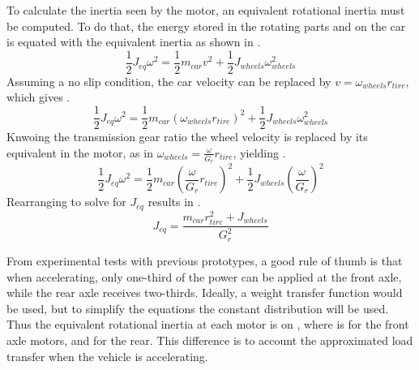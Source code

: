 To calculate the inertia seen by the motor, an equivalent rotational inertia must be computed. To do that, the energy stored in the rotating parts and on the car is equated with the equivalent inertia as shown in .
\begin{equation}
	\frac{1}{2}J_{eq}\omega^2 = \frac{1}{2}m_{car}v^2 + \frac{1}{2}J_{wheels}\omega^2_{wheels}
	\label{eq:iner_equivalent0}
\end{equation}
Assuming a no slip condition, the car velocity can be replaced by $v = \omega_{wheels}r_{tire}$, which gives .
\begin{equation}
	\frac{1}{2}J_{eq}\omega^2 = \frac{1}{2}m_{car}(\omega_{wheels}r_{tire})^2 + \frac{1}{2}J_{wheels}\omega_{wheels}^2
	\label{eq:iner_equivalent1}
\end{equation}
Knwoing the transmission gear ratio the wheel velocity is replaced by its equivalent in the motor, as in $\omega_{wheels} = \frac{\omega}{G_r}r_{tire}$, yielding .
\begin{equation}
	\frac{1}{2}J_{eq}\omega^2 = \frac{1}{2}m_{car}\left(\frac{\omega}{G_r}r_{tire}\right)^2 + \frac{1}{2}J_{wheels}\left(\frac{\omega}{G_r}\right)^2
	\label{eq:iner_equivalent2}
\end{equation}
Rearranging to solve for $J_{eq}$ results in .
\begin{equation}
	J_{eq} = \frac{m_{car}r_{tire}^2 + J_{wheels}}{G_r^2}
	\label{eq:iner_equivalent}
\end{equation}

From experimental tests with previous prototypes, a good rule of thumb is that when accelerating, only one-third of the power can be applied at the front axle, while the rear axle receives two-thirds. Ideally, a weight transfer function would be used, but to simplify the equations the constant distribution will be used. Thus the equivalent rotational inertia at each motor is on , where  is for the front axle motors, and  for the rear. This difference is to account the approximated load transfer when the vehicle is accelerating.

